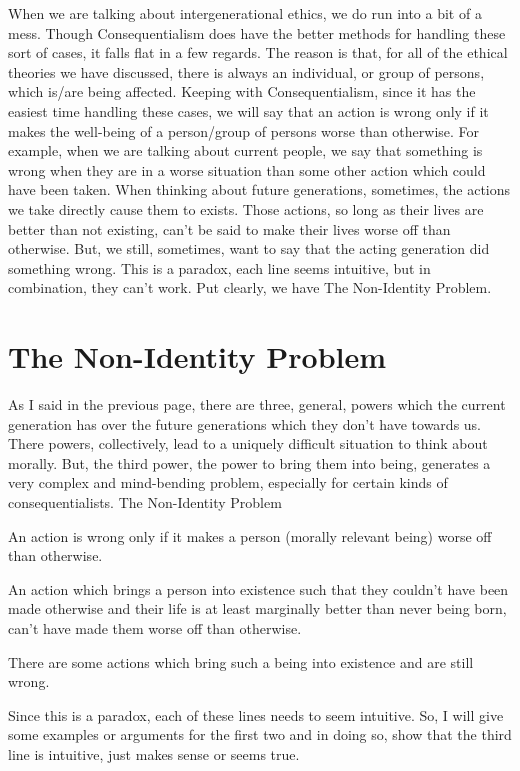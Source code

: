 When we are talking about intergenerational ethics, we do run into a bit of a mess. Though Consequentialism does have the better methods for handling these sort of cases, it falls flat in a few regards. The reason is that, for all of the ethical theories we have discussed, there is always an individual, or group of persons, which is/are being affected. Keeping with Consequentialism, since it has the easiest time handling these cases, we will say that an action is wrong only if it makes the well-being of a person/group of persons worse than otherwise. For example, when we are talking about current people, we say that something is wrong when they are in a worse situation than some other action which could have been taken. When thinking about future generations, sometimes, the actions we take directly cause them to exists. Those actions, so long as their lives are better than not existing, can't be said to make their lives worse off than otherwise. But, we still, sometimes, want to say that the acting generation did something wrong. This is a paradox, each line seems intuitive, but in combination, they can't work. Put clearly, we have The Non-Identity Problem.
\section{The Non-Identity Problem}
As I said in the previous page, there are three, general, powers which the current generation has over the future generations which they don't have towards us. There powers, collectively, lead to a uniquely difficult situation to think about morally. But, the third power, the power to bring them into being, generates a very complex and mind-bending problem, especially for certain kinds of consequentialists. 
The Non-Identity Problem
\begin{earg}
    \item[] An action is wrong only if it makes a person (morally relevant being) worse off than otherwise.
    \item[] An action which brings a person into existence such that they couldn’t have been made otherwise and their life is at least marginally better than never being born, can’t have made them worse off than otherwise.
    \item[] There are some actions which bring such a being into existence and are still wrong.
\end{earg}
Since this is a paradox, each of these lines needs to seem intuitive. So, I will give some examples or arguments for the first two and in doing so, show that the third line is intuitive, just makes sense or seems true. 
